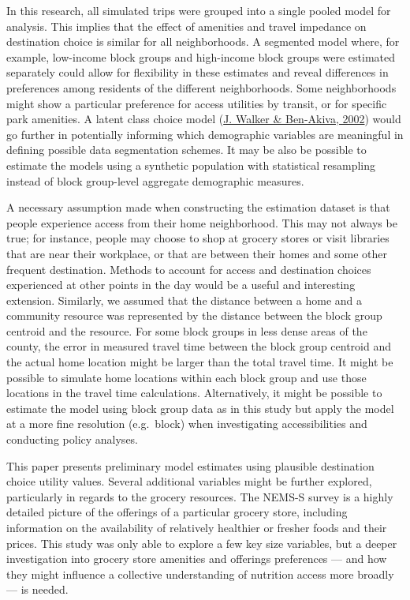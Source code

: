 \documentclass[review, 3p]{elsarticle} %
\begin{document}
In this research, all simulated trips were grouped into a single pooled model
for analysis. This implies that the effect of amenities and travel impedance on
destination choice is similar for all neighborhoods. A segmented model
where, for example, low-income block groups and high-income block groups were
estimated separately could allow for flexibility in these estimates and reveal
differences in preferences among residents of the different neighborhoods. Some
neighborhoods might show a particular preference for access utilities by
transit, or for specific park amenities. A latent class choice model (\protect\hyperlink{ref-walker2002}{J. Walker \& Ben-Akiva, 2002})
would go further in potentially informing which demographic variables are
meaningful in defining possible data segmentation schemes. It may be also be
possible to estimate the models using a synthetic population with statistical
resampling instead of block group-level aggregate demographic measures.

A necessary assumption made when constructing the estimation dataset is that
people experience access from their home neighborhood. This may not always be true;
for instance, people may choose to shop at grocery stores or visit libraries that
are near their workplace, or that are between their homes and some other
frequent destination. Methods to account for access and destination choices
experienced at other points in the day would be a useful and interesting extension.
Similarly, we assumed that the distance between a home and a community resource
was represented by the distance between the block group centroid and the resource.
For some block groups in less dense areas of the county, the error in measured
travel time between the block group centroid and the actual home location might be
larger than the total travel time. It might be possible to simulate home locations
within each block group and use those locations in the travel time calculations.
Alternatively, it might be possible to estimate the model using block group data
as in this study but apply the model at a more fine resolution (e.g.~block) when
investigating accessibilities and conducting policy analyses.

This paper presents preliminary model estimates using plausible destination
choice utility values. Several additional variables might be further explored,
particularly in regards to the grocery resources. The NEMS-S survey is a highly
detailed picture of the offerings of a particular grocery store, including
information on the availability of relatively healthier or fresher foods and
their prices. This study was only able to explore a few key size variables, but
a deeper investigation into grocery store amenities and offerings
preferences --- and how they might influence a collective understanding of
nutrition access more broadly --- is needed.
\end{document}
